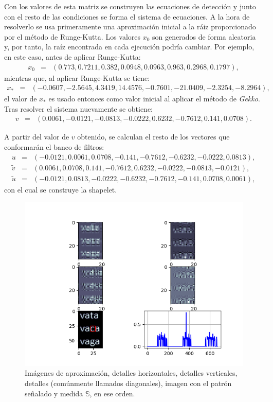 \par Con los valores de esta matriz se construyen las ecuaciones de detecci\'on y junto con el resto de las condiciones se forma el sistema de ecuaciones. A la hora de resolverlo se usa primeramente una aproximaci\'on inicial a la r\'aiz proporcionado por el m\'etodo de Runge-Kutta. Los valores $x_0$ son generados de forma aleatoria y, por tanto, la ra\'iz encontrada en cada ejecuci\'on podr\'ia cambiar. Por ejemplo, en este caso, antes de aplicar Runge-Kutta:
\begin{eqnarray}
x_0&=&(0.773,0.7211,0.382,0.0948,0.0963,0.963,0.2968,0.1797),\nonumber
\end{eqnarray}
mientras que, al aplicar Runge-Kutta se tiene:
\begin{eqnarray}
x_{\ast}&=&(-0.0607,-2.5645,4.3419,14.4576,-0.7601,-21.0409,-2.3254,-8.2964),\nonumber
\end{eqnarray}
el valor de $x_{\ast}$ es usado entonces como valor inicial al aplicar el m\'etodo de \textit{Gekko}. Tras resolver el sistema nuevamente se obtiene:
\begin{eqnarray}
v&=&(0.0061,-0.0121,-0.0813,-0.0222,0.6232,-0.7612,0.141,0.0708).\nonumber
\end{eqnarray}
\par A partir del valor de $v$ obtenido, se calculan el resto de los vectores que conformar\'an el banco de filtros:
\begin{eqnarray}
u&=&(-0.0121,0.0061,0.0708,-0.141,-0.7612,-0.6232,-0.0222,0.0813),\nonumber\\
\tilde{v}&=&(0.0061,0.0708,0.141,-0.7612,0.6232,-0.0222,-0.0813,-0.0121),\nonumber\\
\tilde{u}&=&(-0.0121,0.0813,-0.0222,-0.6232,-0.7612,-0.141,0.0708,0.0061),\nonumber
\end{eqnarray}
con el cual se construye la shapelet.\\

\begin{figure}[h]
\center
\includegraphics[scale=.7]{Graphics/CDetect.png}
\caption{Im\'agenes de aproximaci\'on, detalles horizontales, detalles verticales, detalles (com\'unmente llamados diagonales), imagen con el patr\'on se\~nalado y medida $\mathbb{S}$, en ese orden.}
\label{c-detected}
\end{figure}

